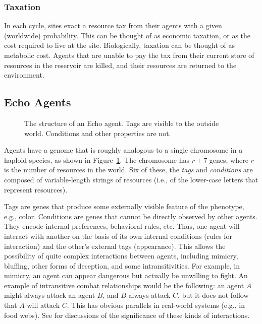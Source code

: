 \subsubsection{Taxation}
\label{dynamics:taxation}

In each cycle, sites exact a resource tax from their agents with a
given (worldwide) probability. This can be thought of as economic
taxation, or as the cost required to live at the site.  Biologically,
taxation can be thought of as metabolic cost. Agents that are unable
to pay the tax from their current store of resources in the reservoir
are killed, and their resources are returned to the environment.

\subsection{Echo Agents}
\label{agents}

\begin{figure}[htbp]
\begin{center}
\leavevmode
{}
\caption{The structure of an Echo agent. Tags are visible to the
outside world. Conditions and other properties are not.
\label{fig:example-agent}}
\end{center}
\end{figure}

Agents have a genome that is roughly analogous to a single chromosome
in a haploid species, as shown in Figure~\ref{fig:example-agent}. The
chromosome has $r + 7$ genes, where $r$ is the number of resources in
the world.  Six of these, the {\em tags\/} and {\em conditions\/} are
composed of variable-length strings of resources (i.e., of the
lower-case letters that represent resources).

Tags are genes that produce some externally visible feature of the
phenotype, e.g., color.  Conditions are genes that cannot be directly
observed by other agents.  They encode internal preferences,
behavioral rules, etc.  Thus, one agent will interact with another on
the basis of its own internal conditions (rules for interaction) and
the other's external tags (appearance).  This allows the possibility
of quite complex interactions between agents, including mimicry,
bluffing, other forms of deception, and some intransitivities.  For
example, in mimicry, an agent can appear dangerous but actually be
unwilling to fight.  An example of intransitive combat relationships
would be the following: an agent $A$ might always attack an agent $B$,
and $B$ always attack $C$, but it does not follow that $A$ will attack
$C$. This has obvious parallels in real-world systems (e.g., in food
webs).  See \cite{Holland92,Holland93b,Holland95a} for discussions of
the significance of these kinds of interactions.

